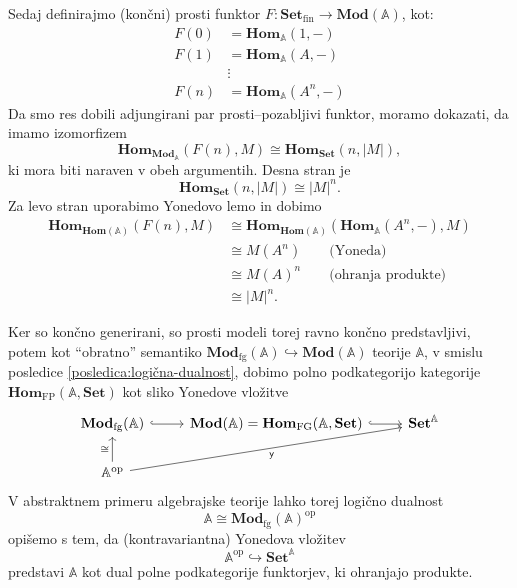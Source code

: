 \documentclass[../kategoricna_logika.tex]{subfiles}
\begin{document}
Sedaj definirajmo (končni) prosti funktor \(F : \mathbf{Set}_{ \mathrm{fin}} \to \mathbf{Mod}(\mathbb{A})\), 
kot:
\begin{align*}
F(0) &= \mathbf{Hom}_{\mathbb{A}}(1,-) \\
F(1) &= \mathbf{Hom}_{\mathbb{A}}(A,-) \\
&\vdots \\
F(n) &= \mathbf{Hom}_{\mathbb{A}}(A^n, -)
\end{align*}
Da smo res dobili adjungirani par prosti--pozabljivi funktor, moramo dokazati, da
imamo izomorfizem
\[ \mathbf{Hom}_{\mathbf{Mod}_{\mathbb{A}}}(F(n), M) \cong \mathbf{Hom}_{\mathbf{Set}}(n, |M|), \]
ki mora biti naraven v obeh argumentih. Desna stran je 
\[\mathbf{Hom}_{\mathbf{Set}}(n, |M|) \cong |M|^n. \]
Za levo stran uporabimo Yonedovo lemo in dobimo
\begin{align*}
\mathbf{Hom}_{\mathbf{Hom}(\mathbb{A})}(F(n),M) &\cong  \mathbf{Hom}_{\mathbf{Hom}(\mathbb{A})}(\mathbf{Hom}_{\mathbb{A}}(A^n, -), M) \\
&\cong M(A^n) \qquad \text{(Yoneda)} \\
&\cong M(A)^n \qquad \text{(ohranja produkte)} \\
&\cong |M|^n.
\end{align*}

Ker so končno generirani, so prosti modeli torej ravno končno predstavljivi, potem
kot "`obratno"' semantiko
\(\mathbf{Mod}_{\mathrm{fg}}(\mathbb{A}) \hookrightarrow \mathbf{Mod}(\mathbb{A})\)
teorije \(\mathbb{A}\), v smislu posledice \ref{posledica:logična-dualnost},
dobimo polno podkategorijo kategorije
\(\mathbf{Hom}_{\mathrm{FP}}(\mathbb{A}, \mathbf{Set})\) kot sliko Yonedove vložitve
\begin{equation*}
\begin{tikzcd}
\mathbf{Mod}_{\mathrm{fg}}(\mathbb{A}) \ar[r, hook] & \mathbf{Mod}(\mathbb{A}) = \mathbf{Hom}_{\mathrm{FG}}(\mathbb{A}, \mathbf{Set}) \ar[r, hook] & \mathbf{Set}^{\mathbb{A}} \\
\mathbb{A}^{\mathrm{op}} \ar[u, "\cong"] \ar[urr, "\mathsf{y}"']
\end{tikzcd}
\end{equation*}
V abstraktnem primeru algebrajske teorije lahko torej logično dualnost
\[ \mathbb{A} \cong \mathbf{Mod}_{\mathrm{fg}}(\mathbb{A})^{\mathrm{op}} \]
opišemo s tem, da (kontravariantna) Yonedova vložitev
\[ \mathbb{A}^{\mathrm{op}} \hookrightarrow \mathbf{Set}^{\mathbb{A}} \]
predstavi \(\mathbb{A}\) kot dual polne podkategorije funktorjev, ki ohranjajo produkte.
%
\end{document}
